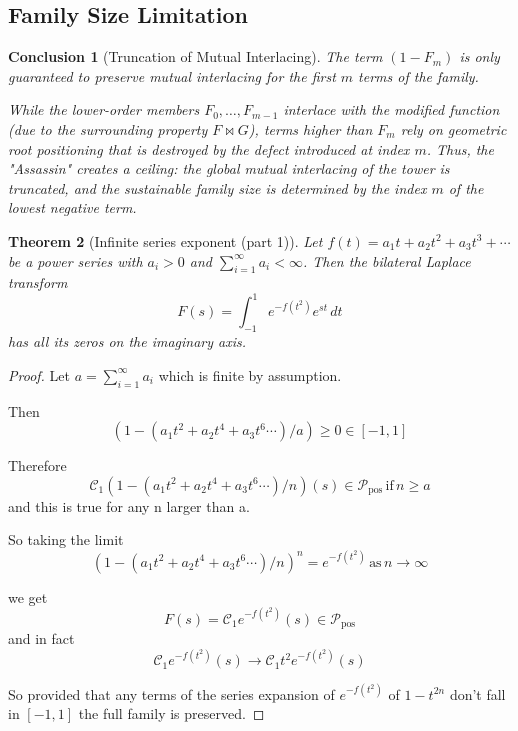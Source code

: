\documentclass[11pt]{article}
\theoremstyle{breakdef}
\newtheorem{theorem}{Theorem}[section]
\newtheorem{conclusion}[theorem]{Conclusion}
\begin{document}
\subsection{Family Size Limitation}
\begin{conclusion}[Truncation of Mutual Interlacing]
The term $(1 - F_m)$ is only guaranteed to preserve mutual interlacing for the first $m$ terms of the family.

While the lower-order members $F_0, \dots, F_{m-1}$ interlace with the modified function (due to the surrounding property $F \bowtie G$), terms higher than $F_m$ rely on geometric root positioning that is destroyed by the defect introduced at index $m$.
Thus, the "Assassin" creates a ceiling: the global mutual interlacing of the tower is truncated, and the sustainable family size is determined by the index $m$ of the lowest negative term.
\end{conclusion}


\begin{theorem}[Infinite series exponent (part 1)]\label{thm:infinite-series-exp}
Let $f(t) = a_1 t + a_2 t^2 + a_3 t^3 + \cdots$ be a power series with  $a_i > 0$
and $\sum_{i=1}
^{\infty} a_i < \infty$. Then the bilateral Laplace transform
\begin{equation}
F(s) = \int_{-1}^{1} e^{-f(t^2)} e^{st}\,dt
\end{equation}
has all its zeros on the imaginary axis.
\end{theorem}

\begin{proof}

Let $a = \sum_{i=1}^{\infty} a_i$ which is finite by assumption.

Then
\begin{equation}
(1-(a_1 t^2 + a_2 t^4 + a_3 t^6 \cdots)/a) \ge 0 \in [-1,1]
\end{equation}

Therefore
\begin{equation}
\mathcal{C}_{1}  (1-(a_1 t^2 + a_2 t^4 + a_3 t^6 \cdots)/n)(s) \in \mathcal{P}_{\mathrm{pos}} \, \text{if} \, n \ge a
\end{equation}
and this is true for any n larger than a.

So taking the limit
\begin{equation}
(1-(a_1 t^2 + a_2 t^4 + a_3 t^6 \cdots)/n)^n = e^{-f(t^2)} \,\text{as} \, n \to\infty
\end{equation}

we get 
\begin{equation}
F(s) =\mathcal{C}_{1} e^{-f(t^2)} (s) \in \mathcal{P}_{\mathrm{pos}}
\end{equation}
and in fact
\begin{equation}
\mathcal{C}_{1} e^{-f(t^2)} (s) \to  \mathcal{C}_{1}t^2 e^{-f(t^2)}(s)
\end{equation}

So provided that any terms of the series expansion of $e^{-f(t^2)}$ of $1- t^{2n}$ don't fall in $[-1,1]$ the full family is preserved.

\end{proof}
\end{document}
